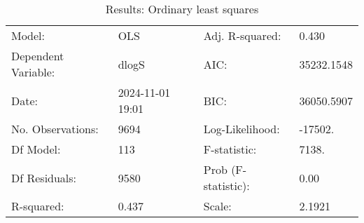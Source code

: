 \begin{table}
\caption{Results: Ordinary least squares}
\label{}
\begin{center}
\begin{tabular}{llll}
\hline
Model:              & OLS              & Adj. R-squared:     & 0.430       \\
Dependent Variable: & dlogS            & AIC:                & 35232.1548  \\
Date:               & 2024-11-01 19:01 & BIC:                & 36050.5907  \\
No. Observations:   & 9694             & Log-Likelihood:     & -17502.     \\
Df Model:           & 113              & F-statistic:        & 7138.       \\
Df Residuals:       & 9580             & Prob (F-statistic): & 0.00        \\
R-squared:          & 0.437            & Scale:              & 2.1921      \\
\hline
\end{tabular}
\end{center}


\end{table}
